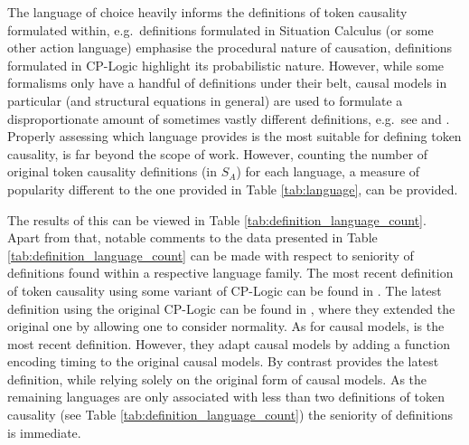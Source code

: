 \documentclass[11pt,a4paper]{book}
\theoremstyle{definition}
\theoremstyle{definition}
\theoremstyle{definition}
\theoremstyle{remark}
\newcommand{\prset}{S_{A}}
\begin{document}
The language of choice heavily informs the definitions of token causality formulated within, e.g.\ definitions formulated in Situation Calculus (or some other action language) emphasise the procedural nature of causation, definitions formulated in CP-Logic highlight its probabilistic nature. However, while some formalisms only have a handful of definitions under their belt, causal models in particular (and structural equations in general) are used to formulate a disproportionate amount of sometimes vastly different definitions,  e.g.\  see \parencite{fenton2017proposed} and \parencite{weslake2015partial}. Properly assessing which language provides is the most suitable for defining token causality, is far beyond the scope of work. However, counting the number of original token causality definitions (in $\prset$) for each language, a measure of popularity different to the one provided in Table \ref{tab:language}, can be provided.


 The results of this can be viewed in Table \ref{tab:definition_language_count}. Apart from that, notable comments to the data presented in Table \ref{tab:definition_language_count} can be made with respect to seniority of definitions found within a respective language family. The most recent definition of token causality using some variant of CP-Logic can be found in \parencite{denecker2019explaining}. The latest definition using the original CP-Logic can be found in \parencite{beckers2016general}, where they extended the original one by allowing one to consider normality. 
As for causal models, \parencite{beckers2018principled} is the most recent definition. However, they adapt causal models by adding  a function encoding timing to the original causal models. By contrast \parencite{weslake2015partial}
provides the latest definition, while relying solely on the original form of causal models. As the remaining languages are only associated with less than two definitions of token causality (see Table \ref{tab:definition_language_count})
the seniority of definitions is immediate. 
\end{document}
